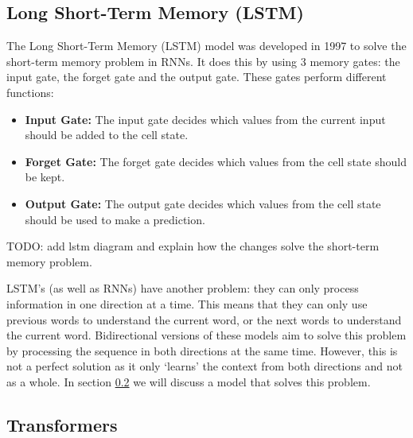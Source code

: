 \subsection{Long Short-Term Memory (LSTM)}
The Long Short-Term Memory (LSTM) model was developed in 1997 to solve the short-term memory problem in RNNs. It does this by
using 3 memory gates: the input gate, the forget gate and the output gate. These gates perform different functions:
\begin{itemize}
    \item \textbf{Input Gate:} The input gate decides which values from the current input should be added to the cell state.
    \item \textbf{Forget Gate:} The forget gate decides which values from the cell state should be kept.
    \item \textbf{Output Gate:} The output gate decides which values from the cell state should be used to make a prediction.
\end{itemize}
TODO: add lstm diagram and explain how the changes solve the short-term memory problem.

LSTM's (as well as RNNs) have another problem: they can only process information in one direction at a time. This means that 
they can only use previous words to understand the current word, or the next words to understand the current word. Bidirectional
versions of these models aim to solve this problem by processing the sequence in both directions at the same time. However, this
is not a perfect solution as it only `learns' the context from both directions and not as a whole. In section \ref{sec:transformers}
we will discuss a model that solves this problem.
\subsection{Transformers}
\label{sec:transformers}
